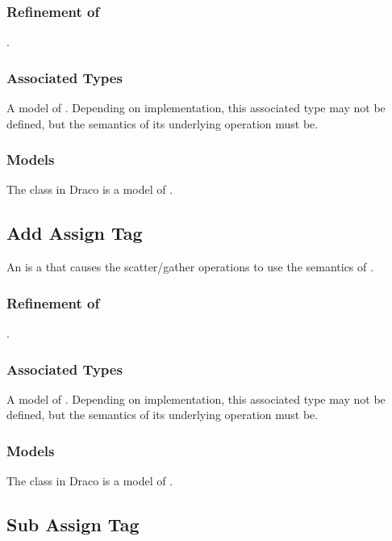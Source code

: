 \documentclass[11pt]{rnote}
\begin{document}
\subsubsection{Refinement of}
.

\subsubsection{Associated Types}

A model of . Depending on implementation, this
associated type may not be defined, but the semantics of its
underlying operation must be.

\subsubsection{Models}

The  class in Draco is a model of
.

\subsection{Add Assign Tag}

An  is a  that
causes the  scatter/gather operations to use
the semantics of .

\subsubsection{Refinement of}
.

\subsubsection{Associated Types}

A model of . Depending on implementation, this
associated type may not be defined, but the semantics of its
underlying operation must be.

\subsubsection{Models}

The  class in Draco is a model of
.

\bigskip

\subsection{Sub Assign Tag}
\end{document}
